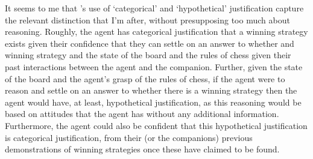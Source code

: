 \documentclass[10pt]{article}
\begin{document}
It seems to me that \citeauthor{Pryor:2018aa}'s use of `categorical' and `hypothetical' justification capture the relevant distinction that I'm after, without presupposing too much about reasoning.
Roughly, the agent has categorical justification that a winning strategy exists given their confidence that they can settle on an answer to whether and winning strategy and the state of the board and the rules of chess given their past interactions between the agent and the companion.
Further, given the state of the board and the agent's grasp of the rules of chess, if the agent were to reason and settle on an answer to whether there is a winning strategy then the agent would have, at least, hypothetical justification, as this reasoning would be based on attitudes that the agent has without any additional information.
Furthermore, the agent could also be confident that this hypothetical justification is categorical justification, from their (or the companions) previous demonstrations of winning strategies once these have claimed to be found.
\end{document}
